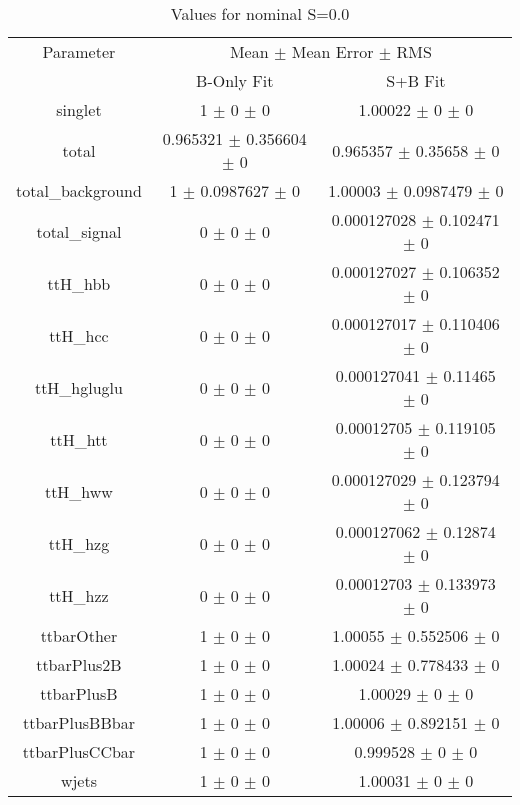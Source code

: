 \begin{table}
\centering
\caption{Values for nominal S=0.0}
\begin{tabular}{ccc}
\toprule
Parameter & \multicolumn{2}{c}{Mean $\pm$ Mean Error $\pm$ RMS}\\
 & B-Only Fit & S+B Fit\\
\midrule
singlet & \num{1} $\pm$ \num{0} $\pm$ \num{0} & \num{1.00022} $\pm$ \num{0} $\pm$ \num{0}\\
total & \num{0.965321} $\pm$ \num{0.356604} $\pm$ \num{0} & \num{0.965357} $\pm$ \num{0.35658} $\pm$ \num{0}\\
total\_background & \num{1} $\pm$ \num{0.0987627} $\pm$ \num{0} & \num{1.00003} $\pm$ \num{0.0987479} $\pm$ \num{0}\\
total\_signal & \num{0} $\pm$ \num{0} $\pm$ \num{0} & \num{0.000127028} $\pm$ \num{0.102471} $\pm$ \num{0}\\
ttH\_hbb & \num{0} $\pm$ \num{0} $\pm$ \num{0} & \num{0.000127027} $\pm$ \num{0.106352} $\pm$ \num{0}\\
ttH\_hcc & \num{0} $\pm$ \num{0} $\pm$ \num{0} & \num{0.000127017} $\pm$ \num{0.110406} $\pm$ \num{0}\\
ttH\_hgluglu & \num{0} $\pm$ \num{0} $\pm$ \num{0} & \num{0.000127041} $\pm$ \num{0.11465} $\pm$ \num{0}\\
ttH\_htt & \num{0} $\pm$ \num{0} $\pm$ \num{0} & \num{0.00012705} $\pm$ \num{0.119105} $\pm$ \num{0}\\
ttH\_hww & \num{0} $\pm$ \num{0} $\pm$ \num{0} & \num{0.000127029} $\pm$ \num{0.123794} $\pm$ \num{0}\\
ttH\_hzg & \num{0} $\pm$ \num{0} $\pm$ \num{0} & \num{0.000127062} $\pm$ \num{0.12874} $\pm$ \num{0}\\
ttH\_hzz & \num{0} $\pm$ \num{0} $\pm$ \num{0} & \num{0.00012703} $\pm$ \num{0.133973} $\pm$ \num{0}\\
ttbarOther & \num{1} $\pm$ \num{0} $\pm$ \num{0} & \num{1.00055} $\pm$ \num{0.552506} $\pm$ \num{0}\\
ttbarPlus2B & \num{1} $\pm$ \num{0} $\pm$ \num{0} & \num{1.00024} $\pm$ \num{0.778433} $\pm$ \num{0}\\
ttbarPlusB & \num{1} $\pm$ \num{0} $\pm$ \num{0} & \num{1.00029} $\pm$ \num{0} $\pm$ \num{0}\\
ttbarPlusBBbar & \num{1} $\pm$ \num{0} $\pm$ \num{0} & \num{1.00006} $\pm$ \num{0.892151} $\pm$ \num{0}\\
ttbarPlusCCbar & \num{1} $\pm$ \num{0} $\pm$ \num{0} & \num{0.999528} $\pm$ \num{0} $\pm$ \num{0}\\
wjets & \num{1} $\pm$ \num{0} $\pm$ \num{0} & \num{1.00031} $\pm$ \num{0} $\pm$ \num{0}\\
\bottomrule
\end{tabular}
\end{table}